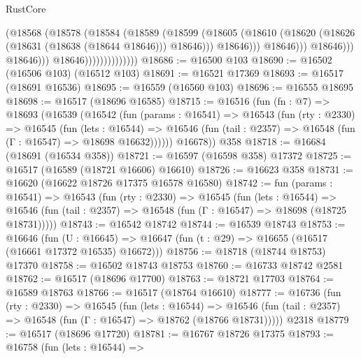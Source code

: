 \begin{lexlean}{RustCore}
\begin{coremodule}
                                            (@18568
                                              (@18578
                                                (@18584
                                                  (@18589
                                                    (@18599
                                                      (@18605
                                                        (@18610
                                                          (@18620
                                                            (@18626
                                                              (@18631 (@18638 (@18644 @18646)))
                                                              @18646)))
                                                        @18646)))
                                                  @18646)))
                                            @18646)))
                                      @18646)))
                                @18646))))))))))))))
@18686 := @16500 @103
@18690 := @16502 (@16506 @103) (@16512 @103)
@18691 := @16521 @17369
@18693 := @16517 (@18691 @16536)
@18695 := @16559 (@16560 @103)
@18696 := @16555 @18695
@18698 := @16517 (@18696 @16585)
@18715 := @16516
    (fun (fn : @7) =>
    @18693
      (@16539
        (@16542
          (fun (params : @16541) =>
          @16543
            (fun (rty : @2330) =>
            @16545
              (fun (lets : @16544) =>
              @16546 (fun (tail : @2357) => @16548 (fun (Γ : @16547) => @18698 @16632))))))
        @16678))
    @358
@18718 := @16684 (@18691 (@16534 @358))
@18721 := @16597 (@16598 @358) @17372
@18725 := @16517 (@16589 (@18721 @16606) @16610)
@18726 := @16623 @358
@18731 := @16620 (@16622 @18726 @17375 @16578 @16580)
@18742 := fun (params : @16541) =>
  @16543
    (fun (rty : @2330) =>
    @16545
      (fun (lets : @16544) =>
      @16546 (fun (tail : @2357) => @16548 (fun (Γ : @16547) => @18698 (@18725 @18731)))))
@18743 := @16542 @18742
@18744 := @16539 @18743
@18753 := @16646
    (fun (U : @16645) => @16647 (fun (t : @29) => @16655 (@16517 (@16661 @17372 @16535) @16672)))
@18756 := @18718 (@18744 @18753) @17370
@18758 := @16502 @18743 @18753
@18760 := @16733 @18742 @2581
@18762 := @16517 (@18696 @17700)
@18763 := @18721 @17703
@18764 := @16589 @18763
@18766 := @16517 (@18764 @16610)
@18777 := @16736
    (fun (rty : @2330) =>
    @16545
      (fun (lets : @16544) =>
      @16546 (fun (tail : @2357) => @16548 (fun (Γ : @16547) => @18762 (@18766 @18731)))))
    @2318
@18779 := @16517 (@18696 @17720)
@18781 := @16767 @18726 @17375
@18793 := @16758
    (fun (lets : @16544) =>

\end{coremodule}
\end{lexlean}
